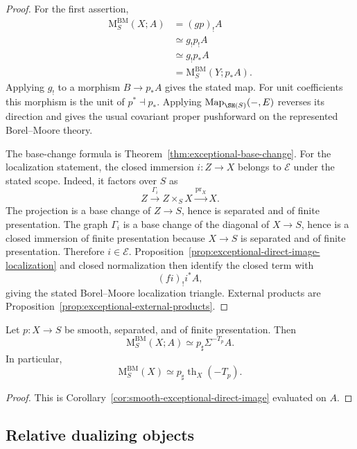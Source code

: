 \begin{proof}
For the first assertion,
\[
\begin{aligned}
    \mathrm M^{\mathrm{BM}}_S(X;A)
    &=(gp)_!A \\
    &\simeq
    g_!p_!A \\
    &\simeq
    g_!p_*A \\
    &=
    \mathrm M^{\mathrm{BM}}_S(Y;p_*A).
\end{aligned}
\]
Applying \(g_!\) to a morphism \(B\to p_*A\) gives the stated map.  For
unit coefficients this morphism is the unit of \(p^*\dashv p_*\).  Applying
\(\operatorname{Map}_{\SH(S)}(-,E)\) reverses its direction and gives the
usual covariant proper pushforward on the represented Borel--Moore theory.

The base-change formula is
Theorem~\ref{thm:exceptional-base-change}.  For the localization statement,
the closed immersion \(i:Z\to X\) belongs to \(\mathcal E\) under the
stated scope.  Indeed, it factors over \(S\) as
\[
    Z
    \xrightarrow{\Gamma_i}
    Z\times_SX
    \xrightarrow{\operatorname{pr}_X}
    X.
\]
The projection is a base change of \(Z\to S\), hence is separated and of
finite presentation.  The graph \(\Gamma_i\) is a base change of the
diagonal of \(X\to S\), hence is a closed immersion of finite presentation
because \(X\to S\) is separated and of finite presentation.  Therefore
\(i\in\mathcal E\).  Proposition~\ref{prop:exceptional-direct-image-localization}
and closed normalization then identify the closed term with
\[
    (fi)_!i^*A,
\]
giving the stated Borel--Moore localization triangle.  External products
are Proposition~\ref{prop:exceptional-external-products}.
\end{proof}

\begin{proposition}
\label{prop:smooth-borel-moore-formula}
Let \(p:X\to S\) be smooth, separated, and of finite presentation.  Then
\[
    \mathrm M^{\mathrm{BM}}_S(X;A)
    \simeq
    p_\sharp\Sigma^{-T_p}A.
\]
In particular,
\[
    \mathrm M^{\mathrm{BM}}_S(X)
    \simeq
    p_\sharp\operatorname{th}_X(-T_p).
\]
\end{proposition}

\begin{proof}
This is Corollary~\ref{cor:smooth-exceptional-direct-image} evaluated on
\(A\).
\end{proof}

\subsection{Relative dualizing objects}

